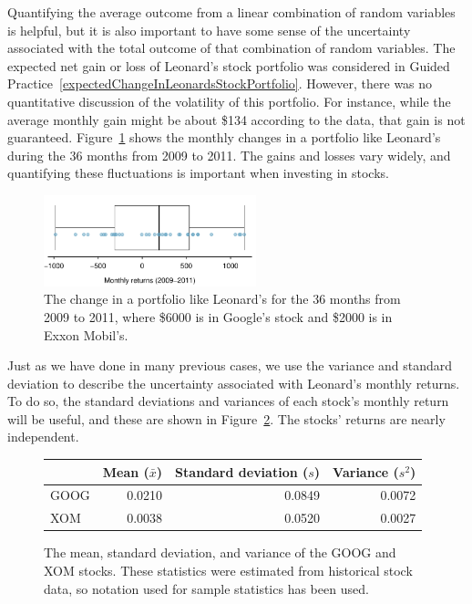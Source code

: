 Quantifying the average outcome from a linear combination of random variables is helpful, but it is also important to have some sense of the uncertainty associated with the total outcome of that combination of random variables. The expected net gain or loss of Leonard's stock portfolio was considered in Guided Practice~\ref{expectedChangeInLeonardsStockPortfolio}. However, there was no quantitative discussion of the volatility of this portfolio. For instance, while the average monthly gain might be about \$134 according to the data, that gain is not guaranteed. Figure~\ref{changeInLeonardsStockPortfolioFor36Months} shows the monthly changes in a portfolio like Leonard's during the 36 months from 2009 to 2011. The gains and losses vary widely, and quantifying these fluctuations is important when investing in stocks.

\begin{figure}[ht]
\centering
\includegraphics[width=0.55\textwidth]{ch_probability/figures/changeInLeonardsStockPortfolioFor36Months/changeInLeonardsStockPortfolioFor36Months}
\caption{The change in a portfolio like Leonard's for the 36 months from 2009 to 2011, where \$6000 is in Google's stock and \$2000 is in Exxon Mobil's.}
\label{changeInLeonardsStockPortfolioFor36Months}
\end{figure}

Just as we have done in many previous cases, we use the variance and standard deviation to describe the uncertainty associated with Leonard's monthly returns. To do so, the standard deviations and variances of each stock's monthly return will be useful, and these are shown in Figure~\ref{sumStatOfGOOGXOM}. The stocks' returns are nearly independent.

\begin{figure}
\centering
\begin{tabular}{lrrr}
\hline
	& Mean ($\bar{x}$) & Standard deviation ($s$) & Variance ($s^2$) \\
\hline
GOOG & 0.0210	& 0.0849				&	0.0072	\\
XOM & 0.0038		& 0.0520					&	0.0027	\\
\hline
\end{tabular}
\caption{The mean, standard deviation, and variance of the GOOG and XOM stocks. These statistics were estimated from historical stock data, so notation used for sample statistics has been used.}
\label{sumStatOfGOOGXOM}
\end{figure}

